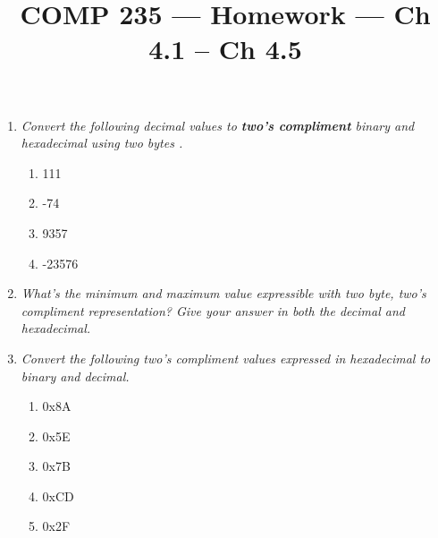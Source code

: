 \documentclass[nobib]{tufte-handout}
\title{COMP 235 --- Homework --- Ch 4.1 -- Ch 4.5}
\author{  }
\date{ }
\begin{document}
\maketitle


\begin{enumerate}
    \item \textit{Convert the following decimal values to \textbf{two's compliment} binary and hexadecimal using two bytes .}
    \begin{enumerate}
        \item 111
        \vspace{1.5in}
        \item -74
        \vspace{1.5in}
        \item 9357
        \vspace{1.5in} 
        \item -23576
        \vspace{1.5in}         
    \end{enumerate}
    \item \textit{What's the minimum and maximum value expressible with two byte, two's compliment representation? Give your answer in both the decimal and hexadecimal.}
    

    \newpage
    \thispagestyle{empty}

    \item \textit{Convert the following two's compliment values expressed in hexadecimal to binary and decimal.}
    \begin{enumerate}
        \item 0x8A
        \vspace{1.5in} 
        \item 0x5E
        \vspace{1.5in} 
        \item 0x7B
        \vspace{1.5in} 
        \item 0xCD
        \vspace{1.5in} 
        \item 0x2F 
    \end{enumerate}

    \newpage
    \thispagestyle{empty}


\end{enumerate}
\end{document}
